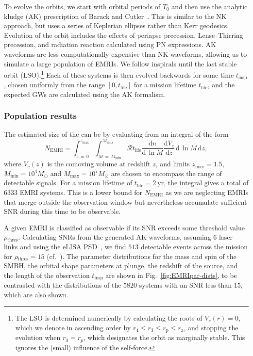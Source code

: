 \documentclass[aps,prd,amsfonts,amssymb,amsmath,nofootinbib,showpacs,superscriptaddress,twocolumn,floatfix]{revtex4-1}
\newcommand{\figref}[1]{Fig.~\ref{fig:#1}}
\newcommand{\units}[1]{\ensuremath{~\mathrm{#1}}}
\newcommand{\sub}[1]{\ensuremath{_\mathrm{#1}}}
\newcommand{\dd}{\ensuremath{\mathrm{d}}}
\newcommand{\diff}[2]{\ensuremath{\dfrac{\dd {#1}}{\dd {#2}}}}
\newcommand{\intd}[4]{\ensuremath{\int_{#1}^{#2}{#3}\,\dd{#4}}}
\begin{document}
To evolve the orbits, we start with orbital periods of $T_0$ and then use the analytic kludge (AK) prescription of Barack and Cutler~\cite{Barack2004}. This is similar to the NK approach, but uses a series of Keplerian ellipses rather than Kerr geodesics. Evolution of the orbit includes the effects of periapse precession, Lense--Thirring
precession, and radiation reaction calculated using PN expressions. AK waveforms are less computationally expensive than NK waveforms, allowing us to simulate a large population of EMRIs. We follow inspirals until the last stable orbit (LSO).\footnote{The LSO is determined numerically by calculating the roots of $V_r(r) = 0$, which we denote in ascending order by $r_4 \leq r_3 \leq r\sub{p} \leq r\sub{a}$, and stopping the evolution when $r_3 = r_p$, which designates the orbit as marginally stable. This ignores the (small) influence of the self-force.} Each of these systems is then evolved backwards for some time $t\sub{insp}$, chosen uniformly from the range $[0,t\sub{life}]$ for a mission lifetime $t\sub{life}$, and the expected GWs are calculated using the AK formalism.

\subsubsection{Population results}

The estimated size of the can be by evaluating from an integral of the form~\cite{Gair2009}
\begin{equation}
\label{eq:EMRI-number}
N\sub{EMRI} = \intd{z\,=\,0}{z\sub{max}}{ \intd{M\,=\,M\sub{min}}{M\sub{max}}{\mathcal{R}t\sub{life}\diff{n}{\,\ln M} \diff{V\sub{c}}{z}}{\,\ln M}}{z},
\end{equation}
where $V\sub{c}(z)$ is the comoving volume at redshift $z$, and limits $z\sub{max} = 1.5$, $M\sub{min} = 10^4 M_\odot$ and $M\sub{max} = 10^7 M_\odot$ are chosen to encompass the range of detectable signals. For a mission lifetime of $t\sub{life} = 2\units{yr}$, the integral gives a total of $6333$ EMRI systems. This is a lower bound for $N\sub{EMRI}$ as we are neglecting EMRIs that merge outside the observation window but nevertheless accumulate sufficient SNR during this time to be observable.

A given EMRI is classified as observable if its SNR exceeds some threshold value $\rho\sub{thres}$. Calculating SNRs from the generated AK waveforms, assuming $6$ laser links and using the eLISA PSD~\cite{Amaro-Seoane2012a}, we find $513$ detectable events across the mission for $\rho\sub{thres} = 15$ (cf.\ \cite{Gair2004,Amaro-Seoane2012a,Mapelli2012}). The parameter distributions for the mass and spin of the SMBH, the orbital shape parameters at plunge, the redshift of the source, and the length of the observation $t\sub{insp}$ are shown in \figref{EMRIpar-dists}, to be contrasted with the distributions of the $5820$ systems with an SNR less than $15$, which are also shown.
\end{document}
